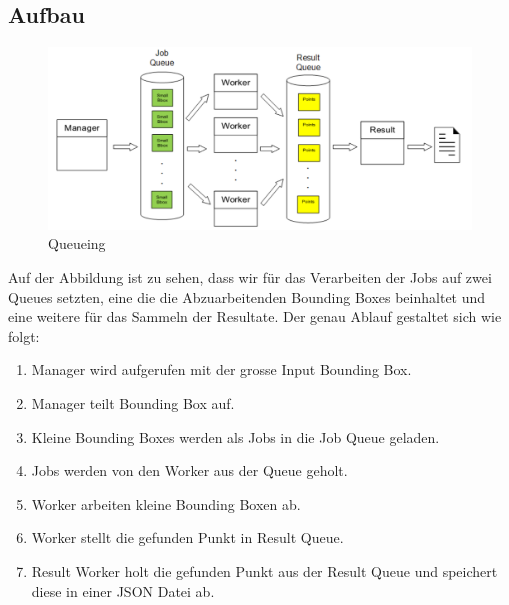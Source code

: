 \subsection{Aufbau}
\label{subsec:ablauf}
\begin{figure}[H]
\includegraphics[width=\textwidth]{images/queuing.png}
\caption[Queueing]{Queueing}
\end{figure}
Auf der Abbildung ist zu sehen, dass wir für das Verarbeiten der Jobs auf zwei Queues setzten, eine die die Abzuarbeitenden Bounding Boxes beinhaltet und eine weitere für das Sammeln der Resultate. Der genau Ablauf gestaltet sich wie folgt:
\begin{enumerate}
		\item Manager wird aufgerufen mit der grosse Input Bounding Box.
		\item Manager teilt Bounding Box auf.
		\item Kleine Bounding Boxes werden als Jobs in die Job Queue geladen.
		\item Jobs werden von den Worker aus der Queue geholt.
		\item Worker arbeiten kleine Bounding Boxen ab.
		\item Worker stellt die gefunden Punkt in Result Queue.
		\item Result Worker holt die gefunden Punkt aus der Result Queue und speichert diese in einer JSON Datei ab. 
\end{enumerate}









